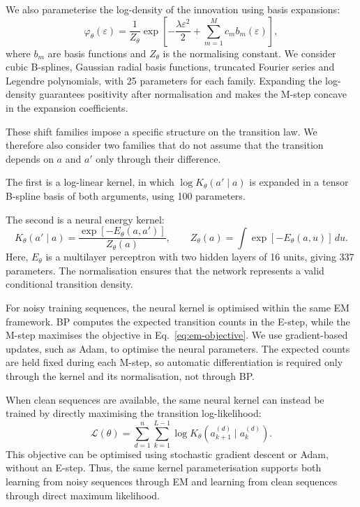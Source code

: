 \documentclass{article}
\begin{document}
We also parameterise the log-density of the innovation
using basis expansions:
\begin{equation}
    \varphi_\theta(\varepsilon)
    =
    \frac{1}{Z_\theta}
    \exp\left[
        -\frac{\lambda\varepsilon^2}{2}
        +
        \sum_{m=1}^{M}c_m b_m(\varepsilon)
    \right],
    \label{eq:basis-innovation}
\end{equation}
where $b_m$ are basis functions and $Z_\theta$ is the
normalising constant. We consider cubic B-splines,
Gaussian radial basis functions, truncated Fourier
series and Legendre polynomials, with 25 parameters
for each family. Expanding the log-density guarantees
positivity after normalisation and makes the M-step
concave in the expansion coefficients.

These shift families impose a specific structure on
the transition law. We therefore also consider two
families that do not assume that the transition depends
on $a$ and $a'$ only through their difference.

The first is a log-linear kernel, in which
$\log K_\theta(a'\mid a)$ is expanded in a tensor
B-spline basis of both arguments, using 100 parameters.

The second is a neural energy kernel:
\begin{equation}
    K_\theta(a'\mid a)
    =
    \frac{
        \exp[-E_\theta(a,a')]
    }{
        Z_\theta(a)
    },
    \qquad
    Z_\theta(a)
    =
    \int
    \exp[-E_\theta(a,u)]\,du.
    \label{eq:neural-kernel}
\end{equation}
Here, $E_\theta$ is a multilayer perceptron with two
hidden layers of 16 units, giving 337 parameters.
The normalisation ensures that the network represents
a valid conditional transition density.

For noisy training sequences, the neural kernel is
optimised within the same EM framework. BP computes
the expected transition counts in the E-step, while
the M-step maximises the objective in
Eq.~\eqref{eq:em-objective}. We use gradient-based
updates, such as Adam, to optimise the neural
parameters. The expected counts are held fixed during
each M-step, so automatic differentiation is required
only through the kernel and its normalisation, not
through BP.

When clean sequences are available, the same neural
kernel can instead be trained by directly maximising
the transition log-likelihood:
\begin{equation}
    \mathcal{L}(\theta)
    =
    \sum_{d=1}^{n}
    \sum_{k=1}^{L-1}
    \log K_\theta
    \left(
        a_{k+1}^{(d)}
        \mid a_k^{(d)}
    \right).
    \label{eq:neural-clean-ml}
\end{equation}
This objective can be optimised using stochastic
gradient descent or Adam, without an E-step. Thus,
the same kernel parameterisation supports both
learning from noisy sequences through EM and learning
from clean sequences through direct maximum
likelihood.
\end{document}
